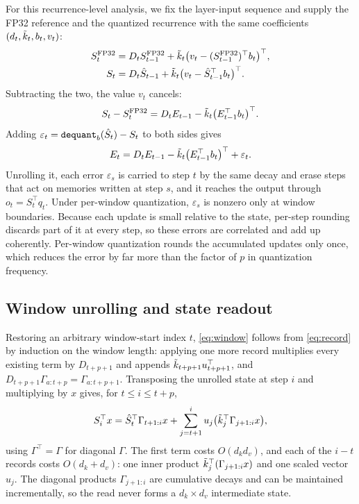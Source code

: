 For this recurrence-level analysis, we fix the layer-input sequence and supply the FP32 reference and the quantized recurrence with the same coefficients $(d_t,\tilde{k}_t,b_t,v_t)$:
\begin{align*}
  S_t^{\mathrm{FP32}} &= D_tS_{t-1}^{\mathrm{FP32}} + \tilde{k}_t\bigl(v_t - (S_{t-1}^{\mathrm{FP32}})^{\top}b_t\bigr)^{\top},\\
  S_t &= D_t\hat{S}_{t-1} + \tilde{k}_t\bigl(v_t - \hat{S}_{t-1}^{\top}b_t\bigr)^{\top}.
\end{align*}
Subtracting the two, the value $v_t$ cancels:
\begin{equation*}
  S_t - S_t^{\mathrm{FP32}} = D_tE_{t-1} - \tilde{k}_t\bigl(E_{t-1}^{\top}b_t\bigr)^{\top}.
\end{equation*}
Adding $\varepsilon_t=\operatorname{\mathtt{dequant}}_b(\hat{S}_t)-S_t$ to both sides gives
\begin{equation}
  E_t=D_tE_{t-1}-\tilde{k}_t\bigl(E_{t-1}^{\top}b_t\bigr)^{\top}+\varepsilon_t.
  \label{eq:deviation}
\end{equation}
Unrolling it, each error $\varepsilon_s$ is carried to step $t$ by the same decay and erase steps that act on memories written at step $s$, and it reaches the output through $o_t=S_t^{\top}q_t$.
Under per-window quantization, $\varepsilon_s$ is nonzero only at window boundaries.
Because each update is small relative to the state, per-step rounding discards part of it at every step, so these errors are correlated and add up coherently.
Per-window quantization rounds the accumulated updates only once, which reduces the error by far more than the factor of $p$ in quantization frequency.

\subsection{Window unrolling and state readout}
\label{app:readout}

Restoring an arbitrary window-start index $t$, \eqref{eq:window} follows from \eqref{eq:record} by induction on the window length: applying one more record multiplies every existing term by $D_{t+p+1}$ and appends $\tilde{k}_{t+p+1}u_{t+p+1}^{\top}$, and $D_{t+p+1}\Gamma_{a:t+p}=\Gamma_{a:t+p+1}$.
Transposing the unrolled state at step $i$ and multiplying by $x$ gives, for $t\le i\le t+p$,
\begin{equation}
  S_i^{\top}x=\hat{S}_t^{\top}\Gamma_{t+1:i}x
    +\sum_{j=t+1}^{i}u_j\bigl(\tilde{k}_j^{\top}\Gamma_{j+1:i}x\bigr),
  \label{eq:readout}
\end{equation}
using $\Gamma^{\top}=\Gamma$ for diagonal $\Gamma$.
The first term costs $O(d_kd_v)$, and each of the $i-t$ records costs $O(d_k+d_v)$: one inner product $\tilde{k}_j^{\top}(\Gamma_{j+1:i}x)$ and one scaled vector $u_j$.
The diagonal products $\Gamma_{j+1:i}$ are cumulative decays and can be maintained incrementally, so the read never forms a $d_k\times d_v$ intermediate state.

